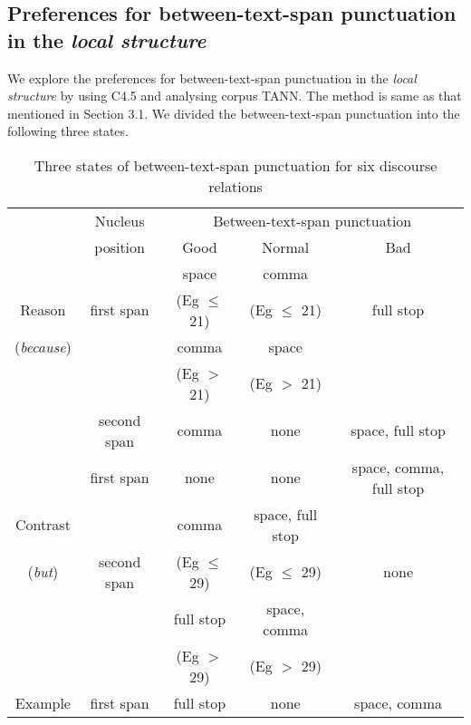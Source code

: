 \documentclass[english]{jnlp_1.2.0}
\begin{document}
\subsection{Preferences for between-text-span punctuation in the \textit{local structure}}

We explore the preferences for between-text-span punctuation in
the \textit{local structure} by using C4.5 and analysing corpus TANN.
The method is same as that mentioned in Section 3.1. We divided the
between-text-span punctuation into the following three states.

\begin{table}[b]
\caption{Three states of between-text-span punctuation for six discourse relations}
\begin{center}
 \begin{tabular}{|c||c||c|c|c|}               \hline
         & Nucleus & \multicolumn{3}{|c|}{Between-text-span punctuation} \\ \cline{3-5}
         & position & Good         & Normal      & Bad  \\ \hline \hline
                   &                & space  & comma &  \\
  Reason           & first span     & (\textsf{Eg} $\leq$ 21) & (\textsf{Eg} $\leq$ 21) & full stop   \\ \cline{3-4}
 (\textit{because}) &                & comma             & space          &   \\              
                    &                & (\textsf{Eg} $>$ 21)   & (\textsf{Eg} $>$ 21)  &   \\ \cline{2-5}
                   & second span       & comma  & none               & space, full stop\\ \hline \hline
                   &    first span  & none              & none  & space, comma, full stop \\ \cline{2-5}
 Contrast          &                & comma             & space, full stop &   \\ 
(\textit{but})     &  second span   & (\textsf{Eg} $\leq$ 29)  & (\textsf{Eg} $\leq$ 29) & none \\ \cline{3-4} 
                   &                & full stop         & space, comma    & \\
                   &          & (\textsf{Eg} $>$ 29)  & (\textsf{Eg} $>$ 29) & \\ \hline \hline
 Example           & first span     & full stop         & none   & space, comma\\ \cline{2-5}

\end{tabular}
\end{center}
\end{table}
\end{document}
